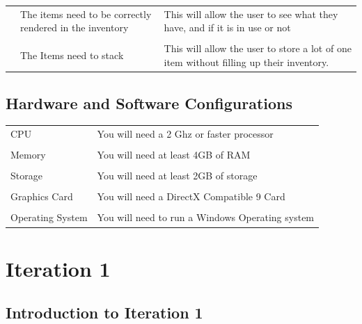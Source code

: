 \documentclass[12pt]{article}
\begin{document}
\begin{tabularx}{\linewidth}{XXX}
                        & The items need to be correctly rendered in the inventory                                           & This will allow the user to see what they have, and if it is in use or not                                                                                                                                                                         \\\\
                        & The Items need to stack                                                                            & This will allow the user to store a lot of one item without filling up their inventory.                                                                                                                                                           
\end{tabularx}
		
		
		
		
		
		\subsection{Hardware and Software Configurations}
		

\begin{tabularx}{\linewidth}{XX}
CPU              & You will need a 2 Ghz or faster processor       \\\\
Memory           & You will need at least 4GB of RAM               \\\\
Storage          & You will need at least 2GB of storage           \\\\
Graphics Card    & You will need a DirectX Compatible 9 Card       \\\\
Operating System & You will need to run a Windows Operating system
\end{tabularx}





\section{Iteration 1}

\subsection{Introduction to Iteration 1}
\end{document}

